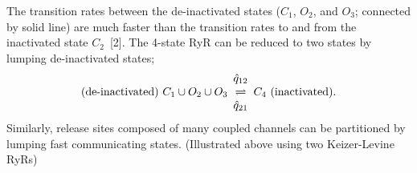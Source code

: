 \documentclass[a0]{a0poster}
\begin{document}
\begin{textblock}{7.5}
\begin{center}
\begin{figure}
\label{fig:2KL}
\end{figure}
\end{center}
\vspace{-0.2in}
\large The transition rates between the de-inactivated states  ($C_1$, $O_2$, and $O_3$; connected by solid line) are much faster than the transition rates to and from the inactivated state $C_2$~[2]. The 4-state RyR can be reduced to two states by lumping de-inactivated states;
\normalsize
\vspace{-0.25in}
$$ \mbox{(de-inactivated)} ~ C_1 \cup O_2 \cup O_3 \begin{array}{c} {\hat{q}_{12}}\\ \rightleftharpoons \\ {\hat{q}_{21}} \end{array} C_4 ~ \mbox{(inactivated)} . $$
\large Similarly, release sites composed of many coupled channels can be partitioned by lumping fast communicating states. (Illustrated above using two Keizer-Levine RyRs) 

\end{textblock}
\end{document}
